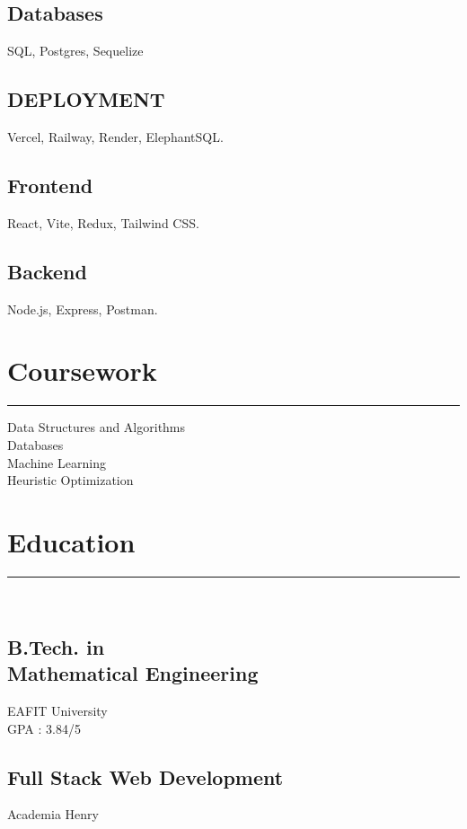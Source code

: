\documentclass[]{rahulworld-resume}
\begin{document}
\begin{minipage}[t]{0.33\textwidth}
\subsection{Databases}
SQL, Postgres, Sequelize\\
\subsection{DEPLOYMENT}
Vercel, Railway, Render, ElephantSQL.\\
\vspace{1pt}
\subsection{Frontend}
React, Vite, Redux, Tailwind CSS.\\
\vspace{1pt}
\subsection{Backend}
Node.js, Express, Postman.\\

\sectionsep
\section{Coursework}
\noindent\rule{5cm}{0.4pt}

Data Structures and Algorithms\\
Databases\\
Machine Learning\\
Heuristic Optimization\\
\sectionsep
\section{Education}
\noindent\rule{3cm}{0.4pt}\\
\subsection{B.Tech. in \\
Mathematical Engineering}
EAFIT University \\
GPA : 3.84/5\\

\subsection{Full Stack Web Development}
Academia Henry

%
%

\end{minipage}
\end{document}
